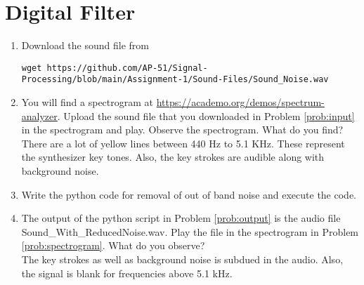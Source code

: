 \documentclass[journal,12pt,twocolumn]{IEEEtran}
\renewcommand\thesection{\arabic{section}}
\begin{document}
\section{Digital Filter}
\begin{enumerate}[label=\thesection.\arabic*
,ref=\thesection.\theenumi]
\item
\label{prob:input}
Download the sound file from  
\begin{lstlisting}
wget https://github.com/AP-51/Signal-Processing/blob/main/Assignment-1/Sound-Files/Sound_Noise.wav
\end{lstlisting}
\item
\label{prob:spectrogram}
You will find a spectrogram at \href{https://academo.org/demos/spectrum-analyzer}{\url{https://academo.org/demos/spectrum-analyzer}}. 
%
Upload the sound file that you downloaded in Problem \ref{prob:input} in the spectrogram  and play.  Observe the spectrogram. What do you find?
\\
%
\solution There are a lot of yellow lines between 440 Hz to 5.1 KHz.  These represent the synthesizer key tones. Also, the key strokes
are audible along with background noise.
\item
\label{prob:output}
Write the python code for removal of out of band noise and execute the code.
\\
\solution

%
\item
The output of the python script in Problem \ref{prob:output} is the audio file Sound\_With\_ReducedNoise.wav. Play the file in the spectrogram in Problem \ref{prob:spectrogram}. What do you observe?
\\
\solution The key strokes as well as background noise is subdued in the audio.  Also,  the signal is blank for frequencies above 5.1 kHz.
\end{enumerate}
\end{document}
